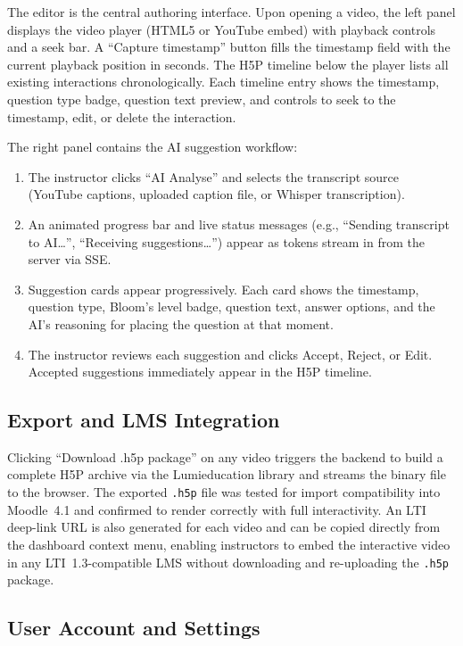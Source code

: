 The editor is the central authoring interface. Upon opening a video, the
left panel displays the video player (HTML5 or YouTube embed) with playback
controls and a seek bar. A ``Capture timestamp'' button fills the
timestamp field with the current playback position in seconds. The H5P
timeline below the player lists all existing interactions chronologically.
Each timeline entry shows the timestamp, question type badge, question
text preview, and controls to seek to the timestamp, edit, or delete the
interaction.

The right panel contains the AI suggestion workflow:
\begin{enumerate}
  \item The instructor clicks ``AI Analyse'' and selects the transcript
  source (YouTube captions, uploaded caption file, or Whisper transcription).
  \item An animated progress bar and live status messages (e.g., ``Sending
  transcript to AI\ldots'', ``Receiving suggestions\ldots'') appear as
  tokens stream in from the server via SSE.
  \item Suggestion cards appear progressively. Each card shows the
  timestamp, question type, Bloom's level badge, question text, answer
  options, and the AI's reasoning for placing the question at that moment.
  \item The instructor reviews each suggestion and clicks Accept, Reject,
  or Edit. Accepted suggestions immediately appear in the H5P timeline.
\end{enumerate}

\subsection{Export and LMS Integration}

Clicking ``Download .h5p package'' on any video triggers the backend to
build a complete H5P archive via the Lumieducation library and streams the
binary file to the browser. The exported \texttt{.h5p} file was tested for
import compatibility into Moodle~4.1 and confirmed to render correctly with
full interactivity. An LTI deep-link URL is also generated for each video
and can be copied directly from the dashboard context menu, enabling
instructors to embed the interactive video in any LTI~1.3-compatible LMS
without downloading and re-uploading the \texttt{.h5p} package.

\subsection{User Account and Settings}

